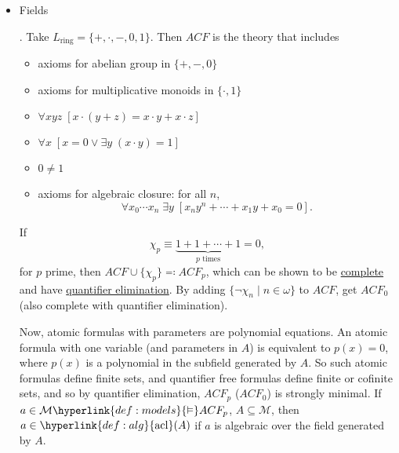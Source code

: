 \documentclass{article}
\let\models\vDash
\DeclareMathOperator{\acl}{acl}
\begin{document}
\begin{eg}
\begin{itemize}
    \item \hypertarget{def:acf}{Fields}. Take $L_{\text{ring}} = \{+, \cdot , - , 0, 1\}$. Then $ACF$ is the theory that includes
      \begin{itemize}
        \item axioms for abelian group in $\{+,-,0\}$
        \item axioms for multiplicative monoids in $\{\cdot, 1\}$
        \item $\forall x y z \; [x \cdot (y + z) = x \cdot y + x \cdot z]$
        \item $\forall x \; [x = 0 \lor \exists y \; (x\cdot y ) = 1]$
        \item $0 \neq 1$
        \item axioms for algebraic closure: for all $n$,
          \begin{equation*}
            \forall x_0 \dotsm x_n \; \exists y \; [x_n y^n + \dotsb + x_1 y + x_0 = 0].
          \end{equation*}
      \end{itemize}
      If
      \begin{equation*}\chi_p \equiv \underbrace{1 + 1 + \dotsb + 1}_{p \text{ times}} = 0,\end{equation*}
      for $p$ prime, then $ACF \cup \{\chi_p\} \eqqcolon ACF_p$, which can be shown to be \hyperlink{def:complete}{complete} and have \hyperlink{def:qe}{quantifier elimination}.
      By adding $\{\lnot \chi_n \mid n \in \omega\}$ to $ACF$, get $ACF_0$ (also complete with quantifier elimination).

      Now, atomic formulas with parameters are polynomial equations.
      An atomic formula with one variable (and parameters in $A$) is equivalent to $p(x) = 0$, where $p(x)$ is a polynomial in the subfield generated by $A$.
      So such atomic formulas define finite sets, and quantifier free formulas define finite or cofinite sets, and so by quantifier elimination, $ACF_p$ ($ACF_0$) is strongly minimal.
      If $a \in \mathcal{M} \hyperlink{def:models}{\models} ACF_p$, $A \subseteq \mathcal{M}$, then $a \in \hyperlink{def:alg}{\acl}(A)$ if $a$ is algebraic over the field generated by $A$.
  \end{itemize}
\end{eg}
\end{document}
